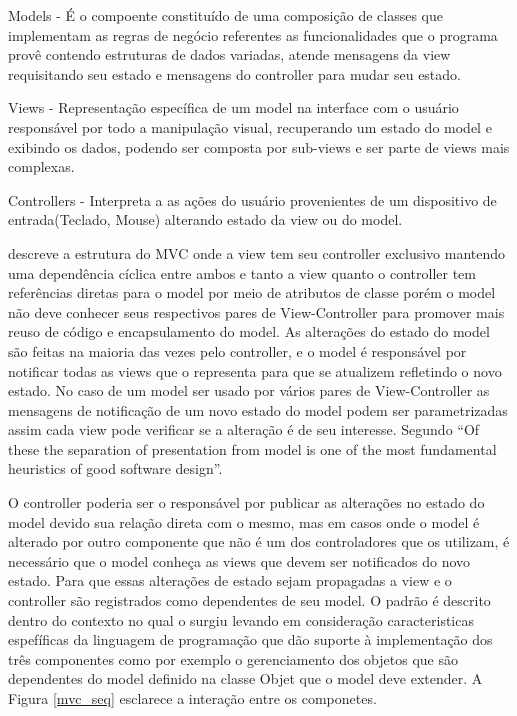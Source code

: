 Models - É o compoente constituído de uma composição de classes que implementam
as regras de negócio referentes as funcionalidades que o programa provê contendo
estruturas de dados variadas, atende mensagens da view requisitando seu estado e
mensagens do controller para mudar seu estado.

Views - Representação específica de um model na interface com o usuário
responsável por todo a manipulação visual, recuperando um estado do
model e exibindo os dados, podendo ser composta por sub-views e ser parte de
views mais complexas.

Controllers - Interpreta a as ações do usuário provenientes de um dispositivo de
entrada(Teclado, Mouse) alterando estado da view ou do model.

 descreve a estrutura do MVC onde a view tem seu
controller exclusivo mantendo uma dependência cíclica entre ambos e tanto a view
quanto o controller tem referências diretas para o model por meio de atributos
de classe porém o model não deve conhecer seus respectivos pares de
View-Controller para promover mais reuso de código e encapsulamento do model. As
alterações do estado do model são feitas na maioria das vezes pelo controller, e
o model é responsável por notificar todas as views que o representa para que
se atualizem refletindo o novo estado. No caso de um model ser usado por vários
pares de View-Controller as mensagens de notificação de um novo estado do model
podem ser parametrizadas assim cada view pode verificar se a alteração é de seu
interesse. Segundo  ``Of these the separation of presentation
from model is one of the most fundamental heuristics of good software design''.

O controller poderia ser o responsável por publicar as alterações no estado do
model devido sua relação direta com o mesmo, mas em casos onde o model é
alterado por outro componente que não é um dos controladores que os utilizam, é
necessário que o model conheça as views que devem ser notificados do novo
estado. Para que essas alterações de estado sejam propagadas a view e o
controller são registrados como dependentes de seu model. O padrão é descrito
dentro do contexto no qual o surgiu levando em consideração caracteristicas
espefíficas da  linguagem de programação que dão suporte à implementação dos
três componentes como por exemplo o gerenciamento dos objetos que são
dependentes do model definido na classe Objet que o model deve extender. A
Figura \ref{mvc_seq} esclarece a interação entre os componetes.

